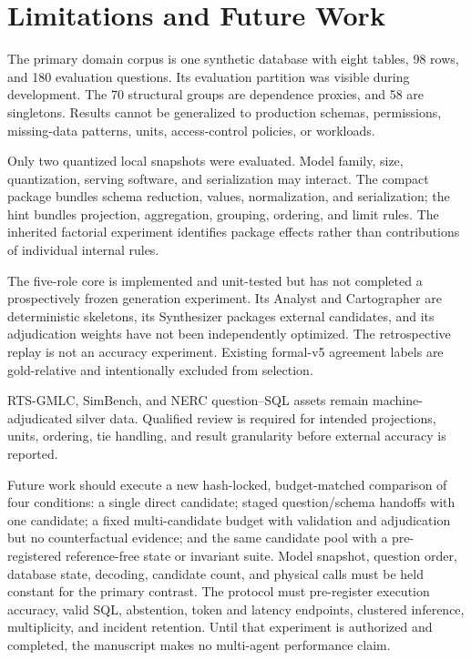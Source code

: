 \documentclass[applsci,article,submit,moreauthors]{Definitions/mdpi}
\begin{document}
\section{Limitations and Future Work}

The primary domain corpus is one synthetic database with eight tables, 98 rows, and 180 evaluation questions. Its evaluation partition was visible during development. The 70 structural groups are dependence proxies, and 58 are singletons. Results cannot be generalized to production schemas, permissions, missing-data patterns, units, access-control policies, or workloads.

Only two quantized local snapshots were evaluated. Model family, size, quantization, serving software, and serialization may interact. The compact package bundles schema reduction, values, normalization, and serialization; the hint bundles projection, aggregation, grouping, ordering, and limit rules. The inherited factorial experiment identifies package effects rather than contributions of individual internal rules.

The five-role core is implemented and unit-tested but has not completed a prospectively frozen generation experiment. Its Analyst and Cartographer are deterministic skeletons, its Synthesizer packages external candidates, and its adjudication weights have not been independently optimized. The retrospective replay is not an accuracy experiment. Existing formal-v5 agreement labels are gold-relative and intentionally excluded from selection.

RTS-GMLC, SimBench, and NERC question--SQL assets remain machine-adjudicated silver data. Qualified review is required for intended projections, units, ordering, tie handling, and result granularity before external accuracy is reported.

Future work should execute a new hash-locked, budget-matched comparison of four conditions: a single direct candidate; staged question/schema handoffs with one candidate; a fixed multi-candidate budget with validation and adjudication but no counterfactual evidence; and the same candidate pool with a pre-registered reference-free state or invariant suite. Model snapshot, question order, database state, decoding, candidate count, and physical calls must be held constant for the primary contrast. The protocol must pre-register execution accuracy, valid SQL, abstention, token and latency endpoints, clustered inference, multiplicity, and incident retention. Until that experiment is authorized and completed, the manuscript makes no multi-agent performance claim.
\end{document}
